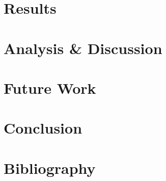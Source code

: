 \documentclass[a4paper,11pt]{article}
\begin{document}
\section{Results}

\section{Analysis & Discussion}

\section{Future Work}

\section{Conclusion}

\section{Bibliography}
\end{document}
